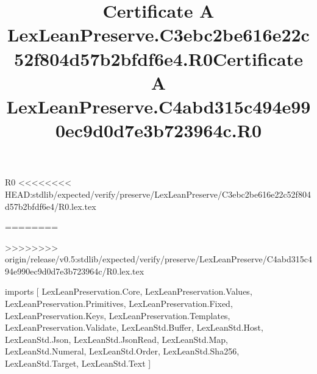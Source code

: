 \begin{lexlean}{R0}
<<<<<<<< HEAD:stdlib/expected/verify/preserve/LexLeanPreserve/C3ebc2be616e22c52f804d57b2bfdf6e4/R0.lex.tex
\title{Certificate A LexLeanPreserve.C3ebc2be616e22c52f804d57b2bfdf6e4.R0}
========
\title{Certificate A LexLeanPreserve.C4abd315c494e990ec9d0d7e3b723964c.R0}
>>>>>>>> origin/release/v0.5:stdlib/expected/verify/preserve/LexLeanPreserve/C4abd315c494e990ec9d0d7e3b723964c/R0.lex.tex
\begin{coremodule}
imports [
  LexLeanPreservation.Core,
  LexLeanPreservation.Values,
  LexLeanPreservation.Primitives,
  LexLeanPreservation.Fixed,
  LexLeanPreservation.Keys,
  LexLeanPreservation.Templates,
  LexLeanPreservation.Validate,
  LexLeanStd.Buffer,
  LexLeanStd.Host,
  LexLeanStd.Json,
  LexLeanStd.JsonRead,
  LexLeanStd.Map,
  LexLeanStd.Numeral,
  LexLeanStd.Order,
  LexLeanStd.Sha256,
  LexLeanStd.Target,
  LexLeanStd.Text
]


\end{coremodule}
\end{lexlean}
